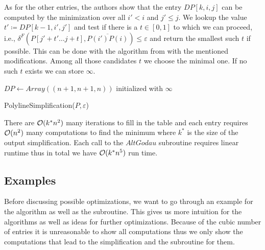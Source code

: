 As for the other entries, the authors show that the entry \(DP[k, i, j]\) can be computed by the minimization over all \(i' < i\) and \(j' \leq j\). We lookup the value \(t' \coloneq DP[k-1, i', j']\) and test if there is a \(t \in [0, 1]\) to which we can proceed, i.e., \(\delta^F(P[j' + t' \dots j + t], \overline{P(i')P(i)}) \leq \varepsilon\) and return the smallest such \(t\) if possible. This can be done with the algorithm from \citeauthor{computing_the_frechet_distance_between_two_polygonal_curves} with the mentioned modifications. Among all those candidates \(t\) we choose the minimal one. If no such \(t\) exists we can store \(\infty\).

\begin{algorithm}[ht]
  \DontPrintSemicolon
  \BlankLine
  \(DP \gets Array((n + 1, n + 1, n))\) initialized with \(\infty\) \;
  \caption{PolylineSimplification(\(P, \varepsilon\))}
  \label{algo:simplify_simple}
\end{algorithm}

There are \(\mathcal{O}(k^* n^2)\) many iterations to fill in the table and each entry requires \(\mathcal{O}(n^2)\) many computations to find the minimum where \(k^*\) is the size of the output simplification. Each call to the \(AltGodau\) subroutine requires linear runtime thus in total we have \(\mathcal{O}(k^*n^5)\) run time.

\subsection{Examples}
Before discussing possible optimizations, we want to go through an example for the algorithm as well as the \citeauthor{computing_the_frechet_distance_between_two_polygonal_curves} subroutine. This gives us more intuition for the algorithms as well as ideas for further optimizations. Because of the cubic number of entries it is unreasonable to show all computations thus we only show the computations that lead to the simplification and the subroutine for them. 


